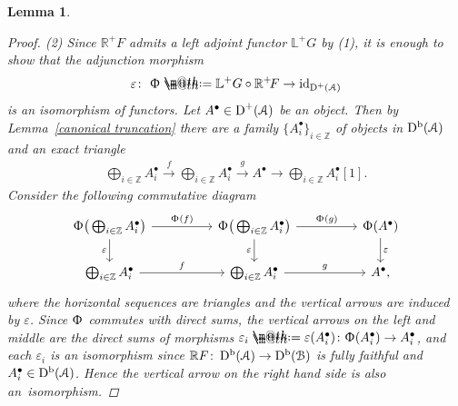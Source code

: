 \documentclass[11pt]{article}
\makeatletter
\numberwithin{equation}{section}
\newtheorem{lem}[dfn]{Lemma}
\newcommand*{\defeq}{\mathrel{\rlap{%
 \raisebox{0.3ex}{$\m@th\cdot$}}%
 \raisebox{-0.3ex}{$\m@th\cdot$}}%
 =}
\numberwithin{equation}{section}
\newcommand{\Db}{\operatorname{D^b}}
\newcommand{\D}{\operatorname{D}}
\newcommand{\id}{\operatorname{id}}
\newcommand{\bL}{\mathbb{L}}
\newcommand{\bR}{\mathbb{R}}
\newcommand{\bZ}{\mathbb{Z}}
\newcommand{\scrA}{\EuScript{A}}
\newcommand{\scrB}{\EuScript{B}}
\makeatother
\begin{document}
\begin{lem}
\begin{proof}
(2) Since $\bR^+\!F$ admits a left adjoint functor $\bL^+G$ by (1), it is enough to show that the adjunction morphism
\begin{gather*}
\varepsilon\colon\ \Upphi\defeq \bL^+G\circ \bR^+\!F\to \id_{\D^+(\scrA)}
\end{gather*}
is an isomorphism of functors. Let $A^{\bullet}\in \D^+(\scrA)$ be an object. Then by Lemma~\ref{canonical truncation} there are a family $\{A^{\bullet}_i\}_{i\in\bZ}$ of objects in $\Db(\scrA)$ and an exact triangle
\begin{gather*}
\bigoplus_{i\in \bZ}A^{\bullet}_i\xrightarrow{f} \bigoplus_{i\in \bZ}A^{\bullet}_i\xrightarrow{g} A^{\bullet}\to \bigoplus_{i\in \bZ}A^{\bullet}_i[1].
\end{gather*}
Consider the following commutative diagram
\[
\begin{tikzcd}
\Upphi\big(\bigoplus_{i\in \bZ}A^{\bullet}_i\big)\arrow[rr, "\Upphi(f)"]\arrow[d, "\varepsilon"']&&\Upphi\big(\bigoplus_{i\in \bZ}A^{\bullet}_i\big)\arrow[rr, "\Upphi(g)"]\arrow[d, "\varepsilon"']&&\Upphi(A^{\bullet})\arrow[d, "\varepsilon"]
\\
\bigoplus_{i\in \bZ}A^{\bullet}_i\arrow[rr, "f"]&&\bigoplus_{i\in \bZ}A^{\bullet}_i\arrow[rr, "g"]&&A^{\bullet},
\end{tikzcd}
\]
where the horizontal sequences are triangles and the vertical arrows are induced by $\varepsilon$. Since $\Upphi$ commutes with direct sums, the vertical arrows on the left and middle are the direct sums of morphisms $\varepsilon_i\defeq\varepsilon(A_i^{\bullet})\colon\Upphi(A_i^{\bullet})\to A_i^{\bullet}$, and each $\varepsilon_i$ is an isomorphism since $\bR F\colon \Db(\scrA)\to\Db(\scrB)$ is fully faithful and $A_i^{\bullet}\in\Db(\scrA)$. Hence the vertical arrow on the right hand side is also an~iso\-morphism.
\end{proof}
\end{lem}
\end{document}
